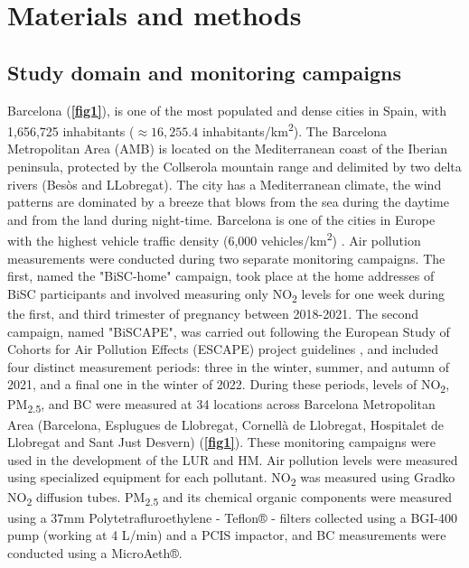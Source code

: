 \documentclass{article}
\begin{document}
\section{Materials and methods}

\subsection{Study domain and monitoring campaigns}

Barcelona (\textbf{\cref{fig1}}), is one of the most populated and dense cities in Spain, with 1,656,725 inhabitants ($\approx16,255.4$ inhabitants/km\textsuperscript{2}). The Barcelona Metropolitan Area (AMB) is located on the Mediterranean coast of the Iberian peninsula, protected by the Collserola mountain range and delimited by two delta rivers (Besòs and LLobregat). The city has a Mediterranean climate, the wind patterns are dominated by a breeze that blows from the sea during the daytime and from the land during night-time. Barcelona is one of the cities in Europe with the highest vehicle traffic density (6,000 vehicles/km\textsuperscript{2}) \cite{casallas2018}. Air pollution measurements were conducted during two separate monitoring campaigns. The first, named the "BiSC-home" campaign, took place at the home addresses of BiSC participants and involved measuring only NO\textsubscript{2} levels for one week during the first, and third trimester of pregnancy between 2018-2021. The second campaign, named "BiSCAPE", was carried out following the European Study of Cohorts for Air Pollution Effects (ESCAPE) project guidelines \cite{ESCAPE2010}, and included four distinct measurement periods: three in the winter, summer, and autumn of 2021, and a final one in the winter of 2022. During these periods, levels of NO\textsubscript{2}, PM\textsubscript{2.5}, and BC were measured at 34 locations across Barcelona Metropolitan Area (Barcelona, Esplugues de Llobregat, Cornellà de Llobregat, Hospitalet de Llobregat and Sant Just Desvern) (\textbf{\cref{fig1}}). These monitoring campaigns were used in the development of the LUR and HM. Air pollution levels were measured using specialized  equipment for each pollutant. NO\textsubscript{2} was measured using Gradko NO\textsubscript{2} diffusion tubes. PM\textsubscript{2.5} and its chemical organic components were measured using a 37mm Polytetrafluroethylene - Teflon® - filters collected using a BGI-400 pump (working at 4 L/min) and a PCIS impactor, and BC measurements were conducted using a MicroAeth®. 
\end{document}
